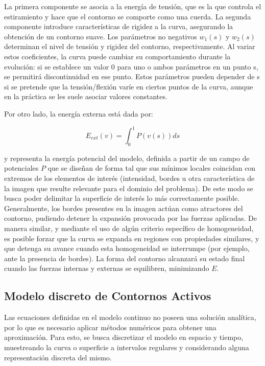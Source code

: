 La primera componente se asocia a la energía de tensión, que es la que controla el estiramiento y hace que el contorno se comporte como una cuerda. La segunda componente introduce características de rigidez a la curva, asegurando la obtención de un contorno suave. Los parámetros no negativos $w_{1}(s)$ y $w_{2}(s)$ determinan el nivel de tensión y rigidez del contorno, respectivamente. Al variar estos coeficientes, la curva puede cambiar su comportamiento durante la evolución: si se establece un valor 0 para uno o ambos parámetros en un punto s, se permitirá discontinuidad en ese punto. Estos parámetros pueden depender de s si se pretende que la tensión/flexión varíe en ciertos puntos de la curva, aunque en la práctica se les suele asociar valores constantes.

Por otro lado, la energía externa está dada por:

$$ E_{ext}(v) = \int_{0}^{1} P(v(s))ds $$

y representa la energía potencial del modelo, definida a partir de un campo de potenciales $P$ que se diseñan de forma tal que sus mínimos locales coincidan con extremos de los elementos de interés (intensidad, bordes u otra característica de la imagen que resulte relevante para el dominio del problema). De este modo se busca poder delimitar la superficie de interés lo más correctamente posible. Generalmente, los bordes presentes en la imagen actúan como atractores del contorno, pudiendo detener la expansión provocada por las fuerzas aplicadas. De manera similar, y mediante el uso de algún criterio específico de homogeneidad, es posible forzar que la curva se expanda en regiones con propiedades similares, y que detenga su avance cuando esta homogeneidad se interrumpe (por ejemplo, ante la presencia de bordes).
La forma del contorno alcanzará su estado final cuando las fuerzas internas y externas se equilibren, minimizando $E$.

\subsection{Modelo discreto de Contornos Activos}\label{section:modelo_discreto_contornos_activos}
Las ecuaciones definidas en el modelo continuo no poseen una solución analítica, por lo que es necesario aplicar métodos numéricos para obtener una aproximación. Para esto, se busca discretizar el modelo en espacio y tiempo, muestreando la curva o superficie a intervalos regulares y considerando alguna representación discreta del mismo.

